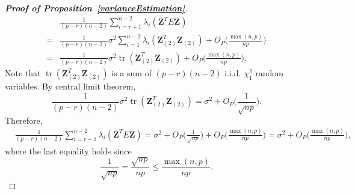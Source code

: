 \documentclass[review]{elsarticle}
\DeclareMathOperator{\mytr}{tr}
\newcommand{\bZ}{\mathbf{Z}}
\theoremstyle{plain}
\theoremstyle{definition}
\theoremstyle{remark}
\begin{document}
\begin{proof}[\textbf{Proof of Proposition~\ref{varianceEstimation}}]
\begin{equation*}
         \begin{aligned}
             &\frac{1}{(p-r)(n-2)}\sum_{i=r+1}^{n-2}\lambda_i(\bZ^T E \bZ)\\
             =&
    \frac{1}{(p-r)(n-2)} \sigma^2\sum_{i=1}^{n-2}\lambda_{i}(\bZ_{(2)}^T \bZ_{(2)})
             +O_P\Big(\frac{\max(n,p)}{np}\Big)\\
             =&
             \frac{1}{(p-r)(n-2)} \sigma^2\mytr(\bZ_{(2)}^T \bZ_{(2)})
             +O_P\Big(\frac{\max(n,p)}{np}\Big).
         \end{aligned}
     \end{equation*}
     Note that $\mytr(\bZ_{(2)}^T \bZ_{(2)})$ is a sum of $(p-r)(n-2)$ i.i.d. $\chi^2_1$ random variables.
     By central limit theorem,
     $$
             \frac{1}{(p-r)(n-2)} \sigma^2\mytr(\bZ_{(2)}^T \bZ_{(2)})
             =\sigma^2+O_P\Big(\frac{1}{\sqrt{np}}\Big).
     $$
     Therefore,
     \begin{equation*}
         \begin{aligned}
             &\frac{1}{(p-r)(n-2)}\sum_{i=r+1}^{n-2}\lambda_i(\bZ^T E \bZ)=
             \sigma^2
             +O_P\Big(\frac{1}{\sqrt{np}}\Big)
             +O_P\Big(\frac{\max(n,p)}{np}\Big)
             =
             \sigma^2
             +O_P\Big(\frac{\max(n,p)}{np}\Big),
         \end{aligned}
     \end{equation*}
     where the last equality holds since
     $$
    \frac{1}{\sqrt{np}} =
    \frac{\sqrt{np}}{np} \leq
    \frac{\max(n,p)}{np}.
     $$
\end{proof}
\end{document}
